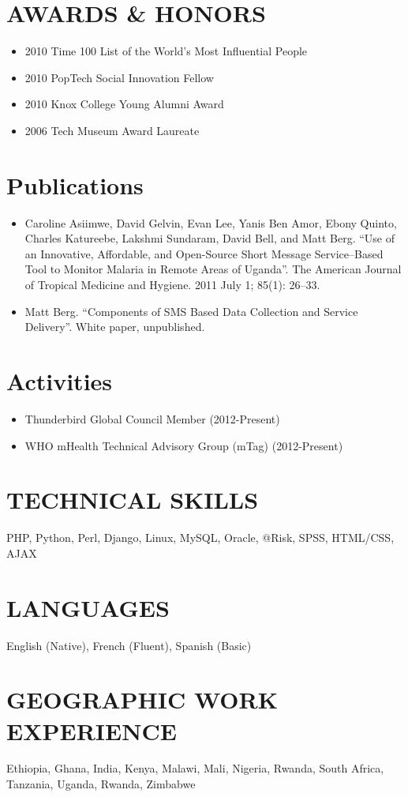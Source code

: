 \documentclass{res}
\begin{document}
\begin{resume}
\section{AWARDS \& HONORS}
\begin{itemize} \itemsep -2pt
	\item 2010 Time 100 List of the World's Most Influential People
	\item 2010 PopTech Social Innovation Fellow
        \item 2010 Knox College Young Alumni Award
	\item 2006 Tech Museum Award Laureate
\end{itemize}

\section{Publications}
\begin{itemize} \itemsep -2pt
	\item Caroline Asiimwe, David Gelvin, Evan Lee, Yanis Ben Amor, Ebony Quinto, Charles Katureebe, Lakshmi Sundaram, David Bell, and Matt Berg. ``Use of an Innovative, Affordable, and Open-Source Short Message Service–Based Tool to Monitor Malaria in Remote Areas of Uganda''. The American Journal of Tropical Medicine and Hygiene. 2011 July 1; 85(1): 26–33.
        \item Matt Berg. ``Components of SMS Based Data Collection and Service Delivery''.  White paper, unpublished.
\end{itemize}

\section{Activities}
\begin{itemize} \itemsep -2pt
	\item Thunderbird Global Council Member (2012-Present)
        \item WHO mHealth Technical Advisory Group (mTag) (2012-Present)
\end{itemize}


\section{TECHNICAL SKILLS}
\vspace{8pt} 
PHP, Python, Perl, Django, Linux, MySQL, Oracle, @Risk, SPSS, HTML/CSS, AJAX

\section{LANGUAGES} 
\vspace{8pt}
English (Native), French (Fluent), Spanish (Basic)

\section{GEOGRAPHIC WORK EXPERIENCE} 
\vspace{8pt}
Ethiopia, Ghana, India, Kenya, Malawi, Mali, Nigeria, Rwanda, South Africa, Tanzania, Uganda, Rwanda, Zimbabwe

\end{resume} 
\end{document}
